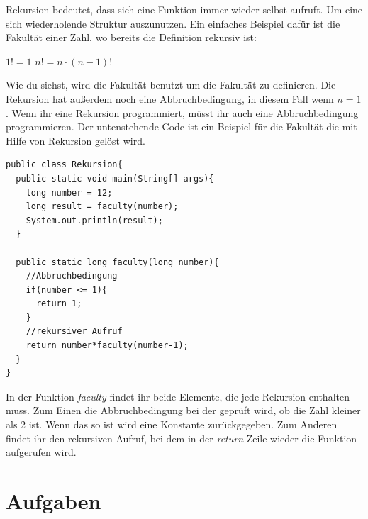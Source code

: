 Rekursion bedeutet, dass sich eine Funktion immer wieder selbst aufruft. Um eine sich wiederholende Struktur auszunutzen. Ein einfaches Beispiel dafür ist die Fakultät einer Zahl, wo bereits die Definition rekursiv ist:

\begin{center}
	$1! = 1$
	$n! = n\cdot (n-1)!$
\end{center}

Wie du siehst, wird die Fakultät benutzt um die Fakultät zu definieren. Die Rekursion hat außerdem noch eine Abbruchbedingung, in diesem Fall wenn $n=1$. Wenn ihr eine Rekursion programmiert, müsst ihr auch eine Abbruchbedingung programmieren. Der untenstehende Code ist ein Beispiel für die Fakultät die mit Hilfe von Rekursion gelöst wird.

\begin{minipage}{\textwidth}
\begin{lstlisting}
public class Rekursion{
  public static void main(String[] args){
    long number = 12;
    long result = faculty(number);
    System.out.println(result);
  }
  
  public static long faculty(long number){
    //Abbruchbedingung
    if(number <= 1){
      return 1;
    }
    //rekursiver Aufruf
    return number*faculty(number-1);
  }
}
\end{lstlisting}
\end{minipage}

In der Funktion \textit{faculty} findet ihr beide Elemente, die jede Rekursion enthalten muss. Zum Einen die Abbruchbedingung bei der geprüft wird, ob die Zahl kleiner als 2 ist. Wenn das so ist wird eine Konstante zurückgegeben. Zum Anderen findet ihr den rekursiven Aufruf, bei dem in der \textit{return}-Zeile wieder die Funktion aufgerufen wird.

\section{Aufgaben}

